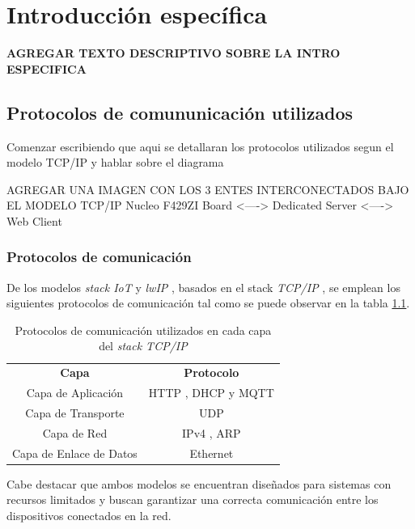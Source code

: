 \chapter{Introducción específica} %

\label{Chapter2}

\textbf{AGREGAR TEXTO DESCRIPTIVO SOBRE LA INTRO ESPECIFICA}

\section{Protocolos de comununicación utilizados}

  Comenzar escribiendo que aqui se detallaran los protocolos utilizados segun el modelo TCP/IP y hablar sobre el diagrama    

  AGREGAR UNA IMAGEN CON LOS 3 ENTES INTERCONECTADOS BAJO EL MODELO TCP/IP 
        Nucleo F429ZI Board <----> Dedicated Server <----> Web Client


\subsection{Protocolos de comunicación}

De los modelos \textit{stack IoT} y \textit{lwIP} \citep{lwip}, basados en el stack \textit{TCP/IP} \citep{tcpip}, se emplean los siguientes protocolos de comunicación tal como se puede observar en la tabla \ref{tab:capa_protocolo}. 


\begin{table}[h]
\centering
\caption{Protocolos de comunicación utilizados en cada capa del \textit{stack TCP/IP}}
\label{tab:capa_protocolo}
\begin{tabular}{|c|c|}
\hline
\textbf{Capa} & \textbf{Protocolo} \\ \cline{1-2}
Capa de Aplicación & HTTP \citep{http}, DHCP \citep{dhcp} y MQTT \citep{mqtt} \\ \cline{1-2}
Capa de Transporte & UDP \citep{udp} \\ \cline{1-2}
Capa de Red & IPv4 \citep{ipv4}, ARP \citep{arp} \\ \cline{1-2}
Capa de Enlace de Datos & Ethernet \citep{ethernet} \\ \cline{1-2}
\end{tabular}
\end{table}

Cabe destacar que ambos modelos se encuentran diseñados para sistemas con recursos limitados y buscan garantizar una correcta comunicación entre los dispositivos conectados en la red.


